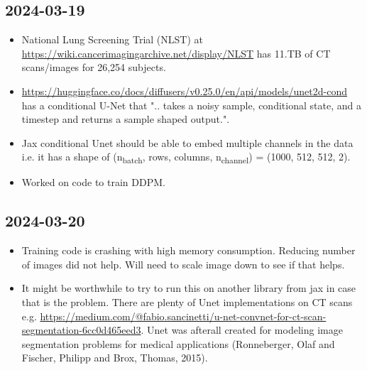 \documentclass[a4paper, 11pt]{article}
\begin{document}
\subsection{2024-03-19}
\label{sec:orgdb2fa63}
\begin{itemize}
\item National Lung Screening Trial (NLST) at \url{https://wiki.cancerimagingarchive.net/display/NLST} has 11.TB of CT scans/images for 26,254 subjects.
\item \url{https://huggingface.co/docs/diffusers/v0.25.0/en/api/models/unet2d-cond} has a conditional U-Net that ".. takes a noisy sample, conditional state, and a timestep and returns a sample shaped output.".
\item Jax conditional Unet should be able to embed multiple channels in the data i.e. it has a shape of (n\textsubscript{batch}, rows, columns, n\textsubscript{channel}) = (1000, 512, 512, 2).
\item Worked on code to train DDPM.
\end{itemize}
\subsection{2024-03-20}
\label{sec:orgc0c50fa}
\begin{itemize}
\item Training code is crashing with high memory consumption. Reducing number of images did not help. Will need to scale image down to see if that helps.
\item It might be worthwhile to try to run this on another library from jax in case that is the problem. There are plenty of Unet implementations on CT scans e.g. \url{https://medium.com/@fabio.sancinetti/u-net-convnet-for-ct-scan-segmentation-6cc0d465eed3}. Unet was afterall created for modeling image segmentation problems for medical applications (Ronneberger, Olaf and Fischer, Philipp and Brox, Thomas, 2015).
\end{itemize}
\end{document}
